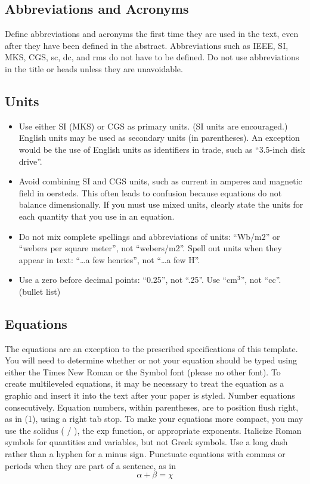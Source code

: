 \documentclass[a4paper, 10pt, conference]{ieeeconf}
\begin{document}
    \subsection{Abbreviations and Acronyms} Define abbreviations and acronyms the first time they are used in the text, even after they have been defined in the abstract. Abbreviations such as IEEE, SI, MKS, CGS, sc, dc, and rms do not have to be defined. Do not use abbreviations in the title or heads unless they are unavoidable.

    \subsection{Units}

    \begin{itemize}

    \item Use either SI (MKS) or CGS as primary units. (SI units are encouraged.) English units may be used as secondary units (in parentheses). An exception would be the use of English units as identifiers in trade, such as ``3.5-inch disk drive''.
    \item Avoid combining SI and CGS units, such as current in amperes and magnetic field in oersteds. This often leads to confusion because equations do not balance dimensionally. If you must use mixed units, clearly state the units for each quantity that you use in an equation.
    \item Do not mix complete spellings and abbreviations of units: ``Wb/m2'' or ``webers per square meter'', not ``webers/m2''.  Spell out units when they appear in text: ``\ldots a few henries'', not ``\ldots a few H''.
    \item Use a zero before decimal points: ``0.25'', not ``.25''. Use ``cm$^3$'', not ``cc''. (bullet list)

    \end{itemize}


    \subsection{Equations}

    The equations are an exception to the prescribed specifications of this template. You will need to determine whether or not your equation should be typed using either the Times New Roman or the Symbol font (please no other font). To create multileveled equations, it may be necessary to treat the equation as a graphic and insert it into the text after your paper is styled. Number equations consecutively. Equation numbers, within parentheses, are to position flush right, as in (1), using a right tab stop. To make your equations more compact, you may use the solidus ( / ), the exp function, or appropriate exponents. Italicize Roman symbols for quantities and variables, but not Greek symbols. Use a long dash rather than a hyphen for a minus sign. Punctuate equations with commas or periods when they are part of a sentence, as in
    \begin{equation}
    \alpha + \beta = \chi
    \end{equation}
\end{document}
